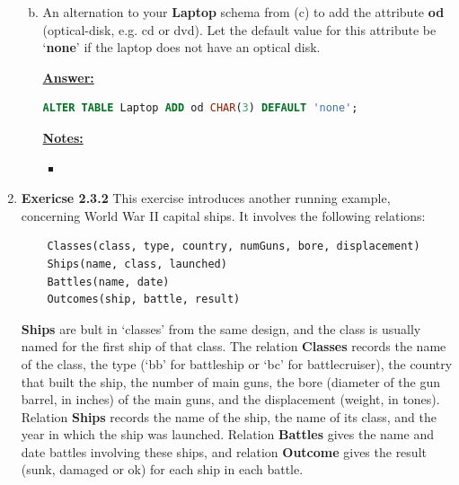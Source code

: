 \documentclass[12pt]{article}
\begin{document}
\begin{enumerate}[1.]
\begin{enumerate}[a)]
\begin{mdframed}
        \end{mdframed}


        \item An alternation to your \textbf{Laptop} schema from (c) to add the
        attribute \textbf{od} (optical-disk, e.g. cd or dvd). Let the default value
        for this attribute be `\textbf{none}' if the laptop does not have an optical
        disk.

        \begin{mdframed}
            \underline{\textbf{Answer:}}

            \bigskip

    \begin{lstlisting}[language=SQL]
    ALTER TABLE Laptop ADD od CHAR(3) DEFAULT 'none';
    \end{lstlisting}

        \end{mdframed}

        \bigskip

        \underline{\textbf{Notes:}}

        \begin{itemize}
            \item
        \end{itemize}
        \end{enumerate}

    \item \textbf{Exericse 2.3.2} This exercise introduces another running example,
    concerning World War II capital ships. It involves the following relations:

    \bigskip

    \begin{lstlisting}
    Classes(class, type, country, numGuns, bore, displacement)
    Ships(name, class, launched)
    Battles(name, date)
    Outcomes(ship, battle, result)
    \end{lstlisting}

    \textbf{Ships} are bult in `classes' from the same design, and the class is
    usually named for the first ship of that class. The relation \textbf{Classes}
    records the name of the class, the type (`bb' for battleship or `bc' for battlecruiser),
    the country that built the ship, the number of main guns, the bore (diameter of
    the gun barrel, in inches) of the main guns, and the displacement (weight, in tones).
    Relation \textbf{Ships} records the name of the ship, the name of its class,
    and the year in which the ship was launched. Relation \textbf{Battles} gives
    the name and date battles involving these ships, and relation \textbf{Outcome}
    gives the result (sunk, damaged or ok) for each ship in each battle.


\end{enumerate}
\end{document}
